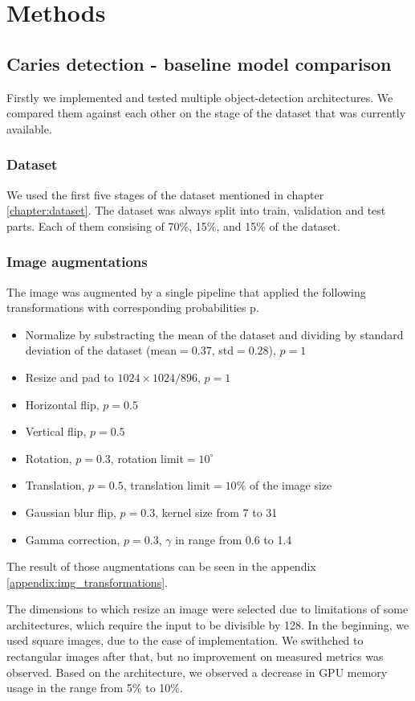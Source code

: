 \chapter{Methods}

\section{Caries detection - baseline model comparison}

Firstly we implemented and tested multiple object-detection architectures. We compared them against each other on the stage of the dataset that was currently available.

\subsection{Dataset}
We used the first five stages of the dataset mentioned in chapter \ref{chapter:dataset}. The dataset was always split into train, validation and test parts. Each of them consising of 70\%, 15\%, and 15\% of the dataset.

\subsection{Image augmentations}
The image was augmented by a single pipeline that applied the following transformations with corresponding probabilities p.
\begin{itemize}
    \item Normalize by substracting the mean of the dataset and dividing by standard deviation of the dataset (mean$=0.37$, std$=0.28$), $p=1$
    \item Resize and pad to $1024\times1024/896$, $p=1$
    \item Horizontal flip, $p=0.5$
    \item Vertical flip, $p=0.5$
    \item Rotation, $p=0.3$, rotation limit$=10^{\circ}$
    \item Translation, $p=0.5$, translation limit$=10\%$ of the image size
    \item Gaussian blur flip, $p=0.3$, kernel size from 7 to 31
    \item Gamma correction, $p=0.3$, $\gamma$ in range from 0.6 to 1.4
\end{itemize}
The result of those augmentations can be seen in the appendix \ref{appendix:img_transformations}.

The dimensions to which resize an image were selected due to limitations of some architectures, which require the input to be divisible by 128. In the beginning, we used square images, due to the ease of implementation. We swithched to rectangular images after that, but no improvement on measured metrics was observed. Based on the architecture, we observed a decrease in GPU memory usage in the range from 5\% to 10\%.

